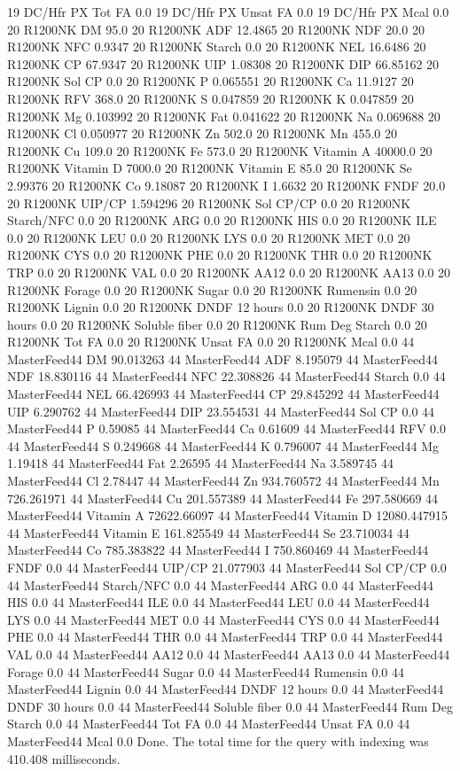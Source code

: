 \documentclass[letterpaper,10pt,english]{sphinxmanual}
\begin{document}
\begin{sphinxVerbatim}[commandchars=\\\{\},numbers=left,firstnumber=1,stepnumber=1]
19 DC/Hfr PX Tot FA 0.0
19 DC/Hfr PX Unsat FA 0.0
19 DC/Hfr PX Mcal 0.0
20 R1200NK DM 95.0
20 R1200NK ADF 12.4865
20 R1200NK NDF 20.0
20 R1200NK NFC \PYGZhy{}0.9347
20 R1200NK Starch 0.0
20 R1200NK NEL 16.6486
20 R1200NK CP 67.9347
20 R1200NK UIP 1.08308
20 R1200NK DIP 66.85162
20 R1200NK Sol CP 0.0
20 R1200NK P 0.065551
20 R1200NK Ca 11.9127
20 R1200NK RFV 368.0
20 R1200NK S 0.047859
20 R1200NK K 0.047859
20 R1200NK Mg 0.103992
20 R1200NK Fat 0.041622
20 R1200NK Na 0.069688
20 R1200NK Cl 0.050977
20 R1200NK Zn 502.0
20 R1200NK Mn 455.0
20 R1200NK Cu 109.0
20 R1200NK Fe 573.0
20 R1200NK Vitamin A 40000.0
20 R1200NK Vitamin D 7000.0
20 R1200NK Vitamin E 85.0
20 R1200NK Se 2.99376
20 R1200NK Co 9.18087
20 R1200NK I 1.6632
20 R1200NK FNDF 20.0
20 R1200NK UIP/CP 1.594296
20 R1200NK Sol CP/CP 0.0
20 R1200NK Starch/NFC 0.0
20 R1200NK ARG 0.0
20 R1200NK HIS 0.0
20 R1200NK ILE 0.0
20 R1200NK LEU 0.0
20 R1200NK LYS 0.0
20 R1200NK MET 0.0
20 R1200NK CYS 0.0
20 R1200NK PHE 0.0
20 R1200NK THR 0.0
20 R1200NK TRP 0.0
20 R1200NK VAL 0.0
20 R1200NK AA\PYGZsh{}12 0.0
20 R1200NK AA\PYGZsh{}13 0.0
20 R1200NK \PYGZpc{} Forage 0.0
20 R1200NK Sugar \PYGZpc{} 0.0
20 R1200NK Rumensin 0.0
20 R1200NK Lignin 0.0
20 R1200NK DNDF 12 hours 0.0
20 R1200NK DNDF 30 hours 0.0
20 R1200NK Soluble fiber 0.0
20 R1200NK Rum Deg Starch 0.0
20 R1200NK Tot FA 0.0
20 R1200NK Unsat FA 0.0
20 R1200NK Mcal 0.0
44 MasterFeed44 DM 90.013263
44 MasterFeed44 ADF 8.195079
44 MasterFeed44 NDF 18.830116
44 MasterFeed44 NFC 22.308826
44 MasterFeed44 Starch 0.0
44 MasterFeed44 NEL 66.426993
44 MasterFeed44 CP 29.845292
44 MasterFeed44 UIP 6.290762
44 MasterFeed44 DIP 23.554531
44 MasterFeed44 Sol CP 0.0
44 MasterFeed44 P 0.59085
44 MasterFeed44 Ca 0.61609
44 MasterFeed44 RFV 0.0
44 MasterFeed44 S 0.249668
44 MasterFeed44 K 0.796007
44 MasterFeed44 Mg 1.19418
44 MasterFeed44 Fat 2.26595
44 MasterFeed44 Na 3.589745
44 MasterFeed44 Cl 2.78447
44 MasterFeed44 Zn 934.760572
44 MasterFeed44 Mn 726.261971
44 MasterFeed44 Cu 201.557389
44 MasterFeed44 Fe 297.580669
44 MasterFeed44 Vitamin A 72622.66097
44 MasterFeed44 Vitamin D 12080.447915
44 MasterFeed44 Vitamin E 161.825549
44 MasterFeed44 Se 23.710034
44 MasterFeed44 Co 785.383822
44 MasterFeed44 I 750.860469
44 MasterFeed44 FNDF 0.0
44 MasterFeed44 UIP/CP 21.077903
44 MasterFeed44 Sol CP/CP 0.0
44 MasterFeed44 Starch/NFC 0.0
44 MasterFeed44 ARG 0.0
44 MasterFeed44 HIS 0.0
44 MasterFeed44 ILE 0.0
44 MasterFeed44 LEU 0.0
44 MasterFeed44 LYS 0.0
44 MasterFeed44 MET 0.0
44 MasterFeed44 CYS 0.0
44 MasterFeed44 PHE 0.0
44 MasterFeed44 THR 0.0
44 MasterFeed44 TRP 0.0
44 MasterFeed44 VAL 0.0
44 MasterFeed44 AA\PYGZsh{}12 0.0
44 MasterFeed44 AA\PYGZsh{}13 0.0
44 MasterFeed44 \PYGZpc{} Forage 0.0
44 MasterFeed44 Sugar \PYGZpc{} 0.0
44 MasterFeed44 Rumensin 0.0
44 MasterFeed44 Lignin 0.0
44 MasterFeed44 DNDF 12 hours 0.0
44 MasterFeed44 DNDF 30 hours 0.0
44 MasterFeed44 Soluble fiber 0.0
44 MasterFeed44 Rum Deg Starch 0.0
44 MasterFeed44 Tot FA 0.0
44 MasterFeed44 Unsat FA 0.0
44 MasterFeed44 Mcal 0.0
Done. The total time for the query with indexing was 410.408 milliseconds.
\end{sphinxVerbatim}
\end{document}
